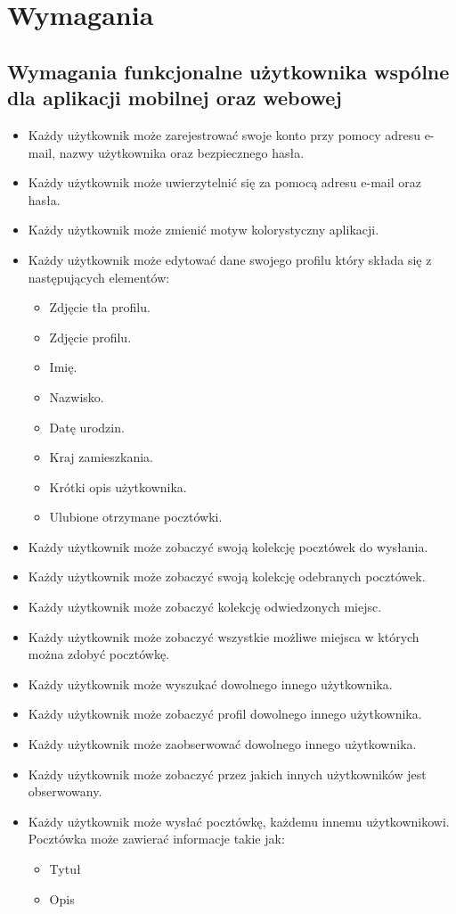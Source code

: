 \documentclass[a4paper,twoside,12pt]{book}
\begin{document}
\chapter{Wymagania}
\label{ch:wymagania}

\section{Wymagania funkcjonalne użytkownika wspólne dla aplikacji mobilnej oraz webowej}
\begin{itemize}
    \item Każdy użytkownik może zarejestrować swoje konto przy pomocy adresu e-mail, nazwy użytkownika oraz bezpiecznego hasła.
    \item Każdy użytkownik może uwierzytelnić się za pomocą adresu e-mail oraz hasła.
    \item Każdy użytkownik może zmienić motyw kolorystyczny aplikacji.
    \item Każdy użytkownik może edytować dane swojego profilu który składa się z następujących elementów:
    \begin{itemize}
        \item Zdjęcie tła profilu.
        \item Zdjęcie profilu.
        \item Imię.
        \item Nazwisko.
        \item Datę urodzin.
        \item Kraj zamieszkania.
        \item Krótki opis użytkownika.
        \item Ulubione otrzymane pocztówki.
    \end{itemize}
    \item Każdy użytkownik może zobaczyć swoją kolekcję pocztówek do wysłania.
    \item Każdy użytkownik może zobaczyć swoją kolekcję odebranych pocztówek.
    \item Każdy użytkownik może zobaczyć kolekcję odwiedzonych miejsc.
    \item Każdy użytkownik może zobaczyć wszystkie możliwe miejsca w których można zdobyć pocztówkę.
    \item Każdy użytkownik może wyszukać dowolnego innego użytkownika.
    \item Każdy użytkownik może zobaczyć profil dowolnego innego użytkownika.
    \item Każdy użytkownik może zaobserwować dowolnego innego użytkownika.
    \item Każdy użytkownik może zobaczyć przez jakich innych użytkowników jest obserwowany.
    \item Każdy użytkownik może wysłać pocztówkę, każdemu innemu użytkownikowi. Pocztówka może zawierać informacje takie jak:
    \begin{itemize}
        \item Tytuł
        \item Opis
    \end{itemize}
\end{itemize}
\end{document}
